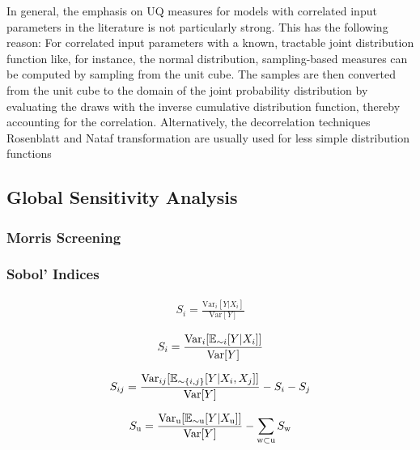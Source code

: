 In general, the emphasis on UQ measures for models with correlated input parameters in the literature is not particularly strong.
This has the following reason: For correlated input parameters with a known, tractable joint distribution function like, for instance, the normal distribution, sampling-based measures can be computed by sampling from the unit cube. The samples are then converted from the unit cube to the domain of the joint probability distribution by evaluating the draws with the inverse cumulative distribution function, thereby accounting for the correlation. Alternatively, the decorrelation techniques Rosenblatt and Nataf transformation are usually used for less simple distribution functions



\subsection{Global Sensitivity Analysis}
\subsubsection{Morris Screening}
\cite{Morris.1991}

\cite{Saltelli.2008}

\cite{lemaire2013structural}
\cite{gentle2006random}
\cite{ge2017extending}
\cite{ge2014efficient}
\cite{campolongo2007effective}
\subsubsection{Sobol' Indices}

\begin{align}
S_i = \frac{\text{Var}_i[Y|X_i ]}{\text{Var}[Y]}
\end{align}

\begin{align}
S_i = \frac{\text{Var}_i[\operatorname*{\mathbb{E}}_{\sim i}[Y|X_i ]]}{\text{Var}[Y]}
\end{align}

\begin{align}
S_{ij} = \frac{\text{Var}_{ij}[\operatorname*{\mathbb{E}}_{\sim \{i,j\}}[Y|X_i, X_j ]]}{\text{Var}[Y]} - S_i - S_j
\end{align}

\begin{align}
S_\text{u} = \frac{\text{Var}_\text{u}[\operatorname*{\mathbb{E}}_{\sim \text{u}}[Y|X_\text{u} ]]}{\text{Var}[Y]} - \sum_{\text{w} \subset \text{u}} S_\text{w}
\end{align}

